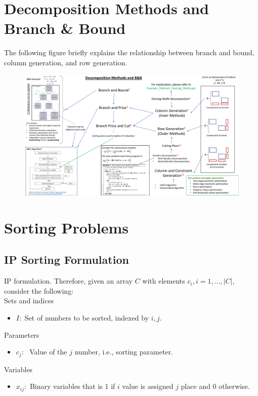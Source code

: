 \documentclass[10pt,bezier]{article}
\begin{document}
\section{Decomposition Methods and Branch \& Bound}\label{section4}

The following figure briefly explains the relationship between branch and bound, column generation, and row generation.

\begin{figure}[!htbp]
    \centering
    \includegraphics[width = \textwidth]{Decomposition_Techniques_Summary.pdf}
    \label{fig1}
\end{figure}


\newpage
\section{Sorting Problems}\label{section5}

\subsection{IP Sorting Formulation} \label{section5.1}
IP formulation. Therefore, given an array $C$ with elements $c_i, i = 1,\ldots,|C|$, consider the following:\\

\noindent Sets and indices
\begin{itemize}
  \item $I$:~Set of numbers to be sorted, indexed by $i,j$.
\end{itemize}
Parameters
\begin{itemize}
    \item $c_{j}$:~ Value of the $j$ number, i.e., sorting parameter.
\end{itemize}
Variables
\begin{itemize}
  \item $x_{ij}$:~Binary variables that is 1 if $i$ value is assigned $j$ place and 0 otherwise.
\end{itemize}
\end{document}
